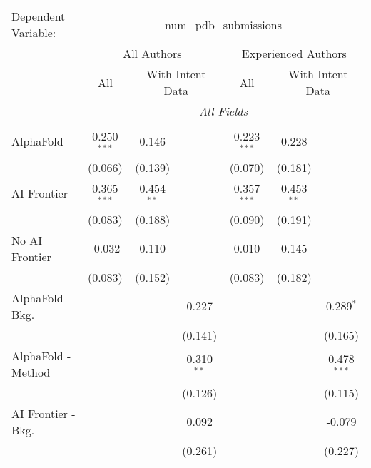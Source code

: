 \begingroup
\centering
\begin{tabular}{lcccccc}
   \tabularnewline \midrule \midrule
   Dependent Variable: & \multicolumn{6}{c}{num\_pdb\_submissions}\\
 & \multicolumn{3}{c}{All Authors} & \multicolumn{3}{c}{Experienced Authors} \\
\cmidrule(lr){2-4} \cmidrule(lr){5-7}
 & \multicolumn{1}{c}{All} & \multicolumn{2}{c}{With Intent Data} & \multicolumn{1}{c}{All} & \multicolumn{2}{c}{With Intent Data} \\
\cmidrule(lr){2-2} \cmidrule(lr){3-4} \cmidrule(lr){5-5} \cmidrule(lr){6-7}
 & \multicolumn{6}{c}{\textit{All Fields}} \\ \\
   AlphaFold               & 0.250$^{***}$ & 0.146        &              & 0.223$^{***}$ & 0.228        &   \\   
                           & (0.066)       & (0.139)      &              & (0.070)       & (0.181)      &   \\   
   AI Frontier             & 0.365$^{***}$ & 0.454$^{**}$ &              & 0.357$^{***}$ & 0.453$^{**}$ &   \\   
                           & (0.083)       & (0.188)      &              & (0.090)       & (0.191)      &   \\   
   No AI Frontier          & -0.032        & 0.110        &              & 0.010         & 0.145        &   \\   
                           & (0.083)       & (0.152)      &              & (0.083)       & (0.182)      &   \\   
   AlphaFold - Bkg.        &               &              & 0.227        &               &              & 0.289$^{*}$\\   
                           &               &              & (0.141)      &               &              & (0.165)\\   
   AlphaFold - Method      &               &              & 0.310$^{**}$ &               &              & 0.478$^{***}$\\   
                           &               &              & (0.126)      &               &              & (0.115)\\   
   AI Frontier - Bkg.      &               &              & 0.092        &               &              & -0.079\\   
                           &               &              & (0.261)      &               &              & (0.227)\\   

\end{tabular}
